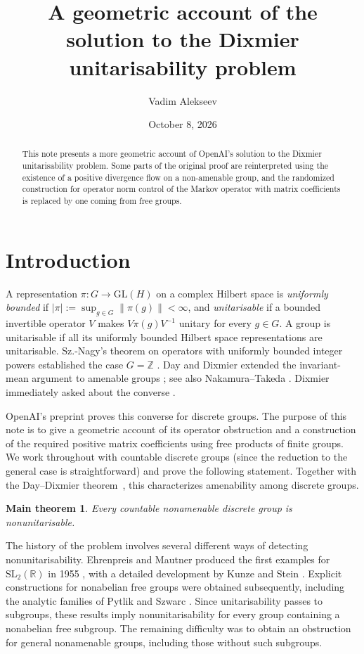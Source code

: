 \documentclass[a4paper,11pt]{amsproc}
\title{A geometric account of the solution to the Dixmier unitarisability problem}
\author{Vadim Alekseev}
\date{October 8, 2026}%
\numberwithin{equation}{section}
\newtheorem*{maintheorem}{Main theorem}
\theoremstyle{definition}
\newcommand{\R}{\mathbb R}
\newcommand{\norm}[1]{\left\lVert#1\right\rVert}
\begin{document}
\begin{abstract}
This note presents a more geometric account of OpenAI's solution to the Dixmier unitarisability problem. Some parts of the original proof are reinterpreted using the existence of a positive divergence flow on a non-amenable group, and the randomized construction for operator norm control of the Markov operator with matrix coefficients is replaced by one coming from free groups.
\end{abstract}
\maketitle\thispagestyle{plain}

\section*{Introduction}
A representation $\pi:G\to\mathrm{GL}(H)$ on a complex Hilbert space is \emph{uniformly bounded} if $|\pi|:=\sup_{g\in G}\norm{\pi(g)}<\infty$, and \emph{unitarisable} if a bounded invertible operator $V$ makes $V\pi(g)V^{-1}$ unitary for every $g\in G$. A group is unitarisable if all its uniformly bounded Hilbert space representations are unitarisable. Sz.-Nagy's theorem on operators with uniformly bounded integer powers established the case $G=\mathbb Z$ \cite{sznagy}. Day and Dixmier extended the invariant-mean argument to amenable groups \cite{day,dixmier}; see also Nakamura--Takeda \cite{nt}. Dixmier immediately asked about the converse \cite[\S\,5]{dixmier}.

OpenAI's preprint \cite{openai} proves this converse for discrete groups. The purpose of this note is to give a geometric account of its operator obstruction and a construction of the required positive matrix coefficients using free products of finite groups. We work throughout with countable discrete groups (since the reduction to the general case is straightforward) and prove the following statement. Together with the Day--Dixmier theorem~\cite{day,dixmier}, this characterizes amenability among discrete groups.

\begin{maintheorem}
Every countable nonamenable discrete group is nonunitarisable.
\end{maintheorem}


The history of the problem involves several different ways of detecting nonunitarisability. Ehrenpreis and Mautner produced the first examples for $\mathrm{SL}_2(\R)$ in 1955 \cite{ehrenpreis}, with a detailed development by Kunze and Stein \cite{ks}. Explicit constructions for nonabelian free groups were obtained subsequently, including the analytic families of Pytlik and Szwarc \cite{ps}. Since unitarisability passes to subgroups, these results imply nonunitarisability for every group containing a nonabelian free subgroup. The remaining difficulty was to obtain an obstruction for general nonamenable groups, including those without such subgroups.
\end{document}
